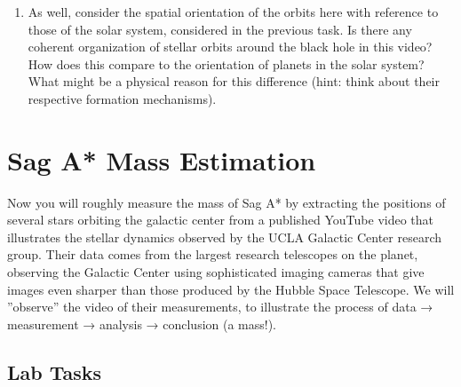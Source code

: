 \begin{enumerate}
	\item As well, consider the spatial orientation of the orbits here with reference to those of the solar
	system, considered in the previous task. Is there any coherent organization of stellar orbits
	around the black hole in this video? How does this compare to the orientation of planets in
	the solar system? What might be a physical reason for this difference (hint: think about their
	respective formation mechanisms).
\end{enumerate}

\section{Sag A* Mass Estimation}

Now you will roughly measure the mass of Sag A* by extracting the positions of several stars orbiting
the galactic center from a published YouTube video that illustrates the stellar dynamics observed by
the UCLA Galactic Center research group. Their data comes from the largest research telescopes on
the planet, observing the Galactic Center using sophisticated imaging cameras that give images even
sharper than those produced by the Hubble Space Telescope. We will ”observe” the video of their
measurements, to illustrate the process of data → measurement → analysis → conclusion (a mass!).

\subsection{Lab Tasks}

